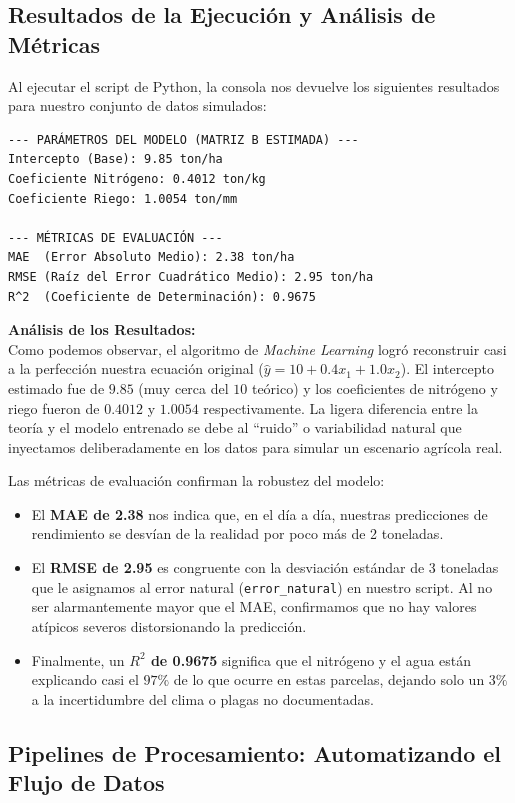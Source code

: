 \documentclass{article}
\begin{document}
\subsection{Resultados de la Ejecución y Análisis de Métricas}

Al ejecutar el script de Python, la consola nos devuelve los siguientes resultados para nuestro conjunto de datos simulados:

\begin{verbatim}
--- PARÁMETROS DEL MODELO (MATRIZ B ESTIMADA) ---
Intercepto (Base): 9.85 ton/ha
Coeficiente Nitrógeno: 0.4012 ton/kg
Coeficiente Riego: 1.0054 ton/mm

--- MÉTRICAS DE EVALUACIÓN ---
MAE  (Error Absoluto Medio): 2.38 ton/ha
RMSE (Raíz del Error Cuadrático Medio): 2.95 ton/ha
R^2  (Coeficiente de Determinación): 0.9675
\end{verbatim}

\textbf{Análisis de los Resultados:} \\
Como podemos observar, el algoritmo de \textit{Machine Learning} logró reconstruir casi a la perfección nuestra ecuación original ($\hat{y} = 10 + 0.4x_1 + 1.0x_2$). El intercepto estimado fue de $9.85$ (muy cerca del $10$ teórico) y los coeficientes de nitrógeno y riego fueron de $0.4012$ y $1.0054$ respectivamente. La ligera diferencia entre la teoría y el modelo entrenado se debe al ``ruido'' o variabilidad natural que inyectamos deliberadamente en los datos para simular un escenario agrícola real.

Las métricas de evaluación confirman la robustez del modelo:
\begin{itemize}
    \item El \textbf{MAE de 2.38} nos indica que, en el día a día, nuestras predicciones de rendimiento se desvían de la realidad por poco más de 2 toneladas.
    \item El \textbf{RMSE de 2.95} es congruente con la desviación estándar de 3 toneladas que le asignamos al error natural (\texttt{error\_natural}) en nuestro script. Al no ser alarmantemente mayor que el MAE, confirmamos que no hay valores atípicos severos distorsionando la predicción.
    \item Finalmente, un \textbf{$R^2$ de 0.9675} significa que el nitrógeno y el agua están explicando casi el $97\%$ de lo que ocurre en estas parcelas, dejando solo un $3\%$ a la incertidumbre del clima o plagas no documentadas.
\end{itemize}

\subsection{Pipelines de Procesamiento: Automatizando el Flujo de Datos}
\end{document}
